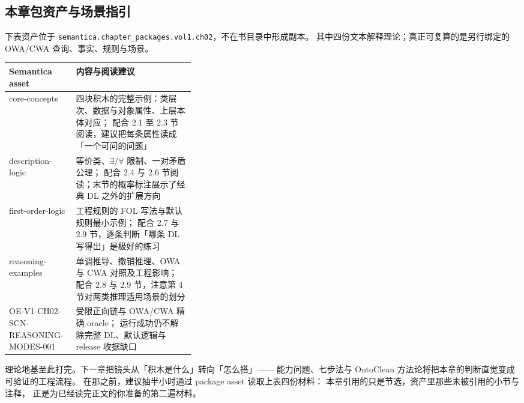 \subsection{本章包资产与场景指引}

下表资产位于 \texttt{semantica.chapter\_packages.vol1.ch02}，不在书目录中形成副本。
其中四份文本解释理论；真正可复算的是另行绑定的 OWA/CWA 查询、事实、规则与场景。

\begin{center}
\begin{tabularx}{\linewidth}{@{}>{\ttfamily\footnotesize}p{0.36\linewidth}X@{}}
\toprule
\normalfont\textbf{Semantica asset} & \textbf{内容与阅读建议} \\
\midrule
core-concepts & 四块积木的完整示例：类层次、数据与对象属性、上层本体对应；
配合 2.1 至 2.3 节阅读，建议把每条属性读成「一个可问的问题」 \\
description-logic & 等价类、\(\exists\)/\(\forall\) 限制、一对矛盾公理；
配合 2.4 与 2.6 节阅读；末节的概率标注展示了经典 DL 之外的扩展方向 \\
first-order-logic & 工程规则的 FOL 写法与默认规则最小示例；
配合 2.7 与 2.9 节，逐条判断「哪条 DL 写得出」是极好的练习 \\
reasoning-examples & 单调推导、撤销推理、OWA 与 CWA 对照及工程影响；
配合 2.8 与 2.9 节，注意第 4 节对两类推理适用场景的划分 \\
OE-V1-CH02-SCN-REASONING-MODES-001 & 受限正向链与 OWA/CWA 精确 oracle；
运行成功仍不解除完整 DL、默认逻辑与 release 收据缺口 \\
\bottomrule
\end{tabularx}
\end{center}

理论地基至此打完。下一章把镜头从「积木是什么」转向「怎么搭」——
能力问题、七步法与 OntoClean 方法论将把本章的判断直觉变成可验证的工程流程。
在那之前，建议抽半小时通过 package asset 读取上表四份材料：
本章引用的只是节选，资产里那些未被引用的小节与注释，
正是为已经读完正文的你准备的第二遍材料。
